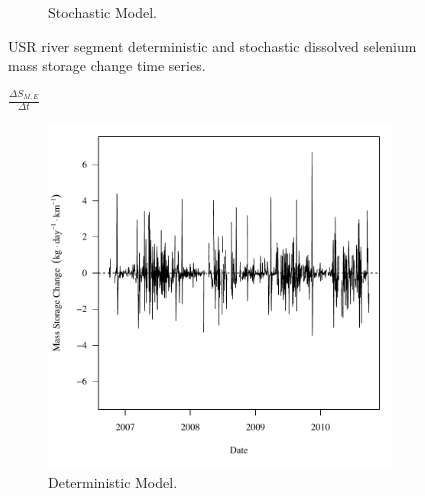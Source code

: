 \begin{linenumbers}
\begin{landscape}
\begin{figure}
\begin{subfigure}{0.7\textwidth}
			\caption{Stochastic Model.}
		\end{subfigure}
		\caption{USR river segment deterministic and stochastic dissolved selenium mass storage change time series.}
	\end{figure}
\end{landscape}

\subfiguremid
\begin{landscape}
	\begin{figure}
		$ \displaystyle \frac{\Delta S_{M,E}}{\Delta t} $
		\begin{subfigure}{0.7\textwidth}
			\centering
			\includegraphics[width=\tableCustomSize]{"Figures/Results_USR/Deterministic/f Segment E"}
			\caption{Deterministic Model.}
		\end{subfigure}%
		\begin{subfigure}{0.7\textwidth}
			\centering

\end{subfigure}
\end{figure}
\end{landscape}
\end{linenumbers}
